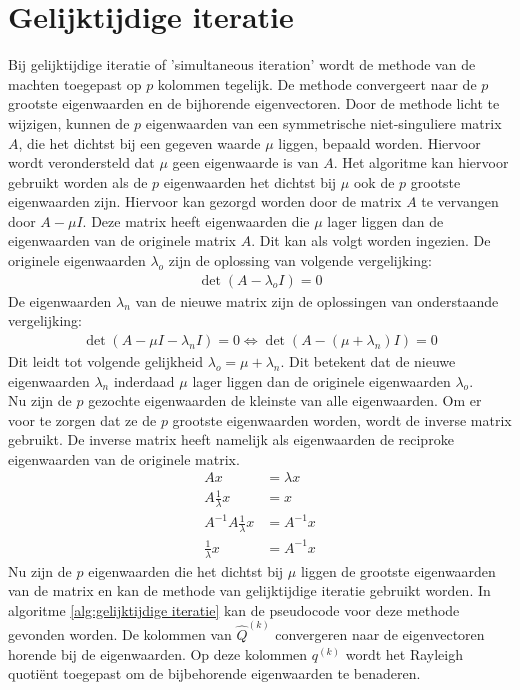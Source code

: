 \documentclass[a4paper, 12pt, titlepage, fleqn]{article}
\begin{document}
\section{Gelijktijdige iteratie}
Bij gelijktijdige iteratie of 'simultaneous iteration' wordt de methode van de machten toegepast op $p$ kolommen tegelijk. De methode convergeert naar de $p$ grootste eigenwaarden en de bijhorende eigenvectoren. Door de methode licht te wijzigen, kunnen de $p$ eigenwaarden van een symmetrische niet-singuliere matrix $A$, die het dichtst bij een gegeven waarde $\mu$ liggen, bepaald worden. Hiervoor wordt verondersteld dat $\mu$ geen eigenwaarde is van $A$. Het algoritme kan hiervoor gebruikt worden als de $p$ eigenwaarden het dichtst bij $\mu$ ook de $p$ grootste eigenwaarden zijn. Hiervoor kan gezorgd worden door de matrix $A$ te vervangen door $A - \mu I$. Deze matrix heeft eigenwaarden die $\mu$ lager liggen dan de eigenwaarden van de originele matrix $A$. Dit kan als volgt worden ingezien. De originele eigenwaarden $\lambda_o$ zijn de oplossing van volgende vergelijking:
\begin{align*}
\det (A-\lambda_o I) = 0
\end{align*}
De eigenwaarden $\lambda_n$ van de nieuwe matrix zijn de oplossingen van onderstaande vergelijking:
\begin{align*}
\det (A - \mu I - \lambda_n I) = 0 \Leftrightarrow \det(A -(\mu + \lambda_n)I) = 0
\end{align*}
Dit leidt tot volgende gelijkheid $\lambda_o = \mu + \lambda_n$. Dit betekent dat de nieuwe eigenwaarden $\lambda_n$ inderdaad $\mu$ lager liggen dan de originele eigenwaarden $\lambda_o$.\\
Nu zijn de $p$ gezochte eigenwaarden de kleinste van alle eigenwaarden. Om er voor te zorgen dat ze de $p$ grootste eigenwaarden worden, wordt de inverse matrix gebruikt. De inverse matrix heeft namelijk als eigenwaarden de reciproke eigenwaarden van de originele matrix.
\begin{align*}
Ax &= \lambda x\\
A\frac{1}{\lambda}x &= x\\
A^{-1}A\frac{1}{\lambda}x &= A^{-1}x\\
\frac{1}{\lambda}x &= A^{-1}x
\end{align*}
Nu zijn de $p$ eigenwaarden die het dichtst bij $\mu$ liggen de grootste eigenwaarden van de matrix en kan de methode van gelijktijdige iteratie gebruikt worden. In algoritme \ref{alg:gelijktijdige iteratie} kan de pseudocode voor deze methode gevonden worden. De kolommen van $\hat{Q}^{(k)}$ convergeren naar de eigenvectoren horende bij de eigenwaarden. Op deze kolommen $q^{(k)}$ wordt het Rayleigh quoti\"ent toegepast om de bijbehorende eigenwaarden te benaderen.
\end{document}
